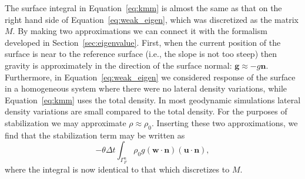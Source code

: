 \documentclass[preprint,12pt,authoryear]{elsarticle}
\begin{document}
The surface integral in Equation~\eqref{eq:kmm} is almost the same as that on the right hand side of 
Equation~\eqref{eq:weak_eigen}, which was discretized as the matrix $M$.
By making two approximations we can connect it with the formalism developed in Section~\ref{sec:eigenvalue}.
First, when the current position of the surface is near to the reference surface (i.e., the slope is not too steep)
then gravity is approximately in the direction of the surface normal: $\mathbf{g} \approx -g \mathbf{n}$.
Furthermore, in Equation~\eqref{eq:weak_eigen} we considered response of the surface in a homogeneous system where there were no lateral density variations,
while Equation~\eqref{eq:kmm} uses the total density.
In most geodynamic simulations lateral density variations are small compared to the total density.
For the purposes of stabilization we may approximate $\rho \approx \rho_0$.
Inserting these two approximations, we find that the stabilization term may be written as
\begin{equation}
-\theta \Delta t \int_{\Gamma_F^n} \rho_0 g ( \mathbf{w \cdot n}) (\mathbf{u \cdot n} ),
\label{eq:kmm_stabilization}
\end{equation}
where the integral is now identical to that which discretizes to $M$.
\end{document}
